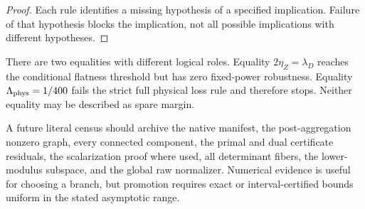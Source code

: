 \begin{proof}
Each rule identifies a missing hypothesis of a specified implication.
Failure of that hypothesis blocks the implication, not all possible
implications with different hypotheses.
\end{proof}

\begin{remark}
There are two equalities with different logical roles.  Equality
\(2\eta_Z=\lambda_D\) reaches the conditional flatness threshold but
has zero fixed-power robustness.  Equality
\(\Lambda_{\rm phys}=1/400\) fails the strict full physical loss rule
and therefore stops.  Neither equality may be described as spare
margin.
\end{remark}

\begin{remark}
A future literal census should archive the native manifest, the
post-aggregation nonzero graph, every connected component, the
primal and dual certificate residuals, the scalarization proof where
used, all determinant fibers, the lower-modulus subspace, and the
global raw normalizer.  Numerical evidence is useful for choosing a
branch, but promotion requires exact or interval-certified bounds
uniform in the stated asymptotic range.
\end{remark}
